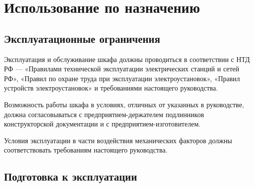 {\color{unimain}\section[Использование по назначению]{Использование по назначению}}

\newcommand{\vchcodes}{ЮТКБ.656463.300-011 РЭ, ЮТКБ.656463.300-012 РЭ, ЮТКБ.656463.300-013 РЭ, ЮТКБ.656463.300-014 РЭ, ЮТКБ.656463.300-038 РЭ, ЮТКБ.656463.300-039 РЭ}

{\color{unimain}\subsection{Эксплуатационные ограничения}}

\begin{enumsub}
\item Эксплуатация и обслуживание шкафа должны проводиться в соответствии с НТД РФ — «Правилами технической эксплуатации электрических станций и сетей РФ», «Правил по охране труда при эксплуатации электроустановок», «Правил устройств электроустановок» и требованиями настоящего руководства.
\item Возможность работы шкафа в условиях, отличных от указанных в руководстве, должна согласовываться с предприятием-держателем подлинников конструкторской документации и с предприятием-изготовителем.
\item Условия эксплуатации в части воздействия механических факторов должны соответствовать требованиям настоящего руководства.
\end{enumsub}

{\color{unimain}\subsection{Подготовка к эксплуатации}}

